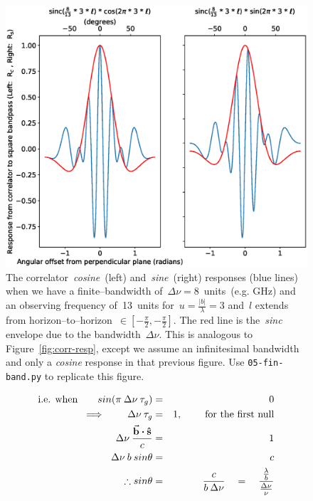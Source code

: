 \documentclass[11pt, a4paper]{article}
\newcommand{\msp}{\mkern \medmuskip}
\begin{document}
\begin{figure}
  \centering
  \includegraphics[width=\textwidth ]{05-fin-band-lecture.eps}
  \caption[]{The correlator~\emph{cosine}~(left) and~\emph{sine}~(right) responses (blue lines) when we have a finite--bandwidth of~$\Delta \nu = 8$~units~(e.g. GHz) and an observing frequency of~13~units for~$u = \frac{|b|}{\lambda} = 3$ and~$l$ extends from horizon--to--horizon~$\in [-\frac{\pi}{2},-\frac{\pi}{2}]$. The red line is the~\emph{sinc} envelope due to the bandwidth~$\Delta \nu $. This is analogous to Figure~\ref{fig:corr-resp}, except we assume an infinitesimal bandwidth and only a \emph{cosine} response in that previous figure. Use \texttt{05-fin-band.py} to replicate this figure.}
  \label{fig:05-fin-band}
\end{figure}

\begin{eqnarray}
  \label{eq:30}
  \mbox{i.e. when} \qquad sin (\pi \msp \Delta \nu \msp \tau _g) &=& 0 \nonumber \\
  \implies \qquad                       \Delta \nu \msp \tau _g  &=& 1 , \hspace{0.8cm} \mbox{for the first null}\nonumber \\
  \Delta \nu \msp  \frac{\vec{\mathbf{b}} \boldsymbol{\cdot} \mathbf{\hat{s}}}{c} &=& 1 \nonumber \\
  \Delta \nu \msp b \msp sin\theta &=& c \nonumber \\
  \therefore sin\theta &=& \frac{c}{b\msp \Delta \nu } \quad = \quad \frac{\frac{\lambda}{b}}{\frac{\Delta \nu }{\nu }} \nonumber
\end{eqnarray}
\end{document}
